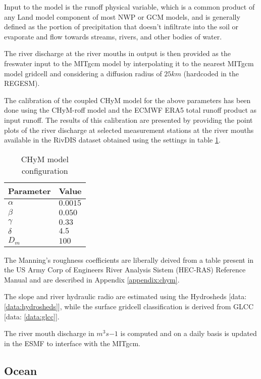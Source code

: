\documentclass[journal abbreviation, manuscript]{copernicus}
\begin{document}
Input to the model is the runoff physical variable, which is a common product
of any Land model component of most NWP or GCM models, and is generally defined
as the portion of precipitation that doesn't infiltrate into the soil or
evaporate and flow towards streams, rivers, and other bodies of water.

The river discharge at the river mouths in output is then provided as the
freswater input to the MITgcm model by interpolating it to the nearest MITgcm
model gridcell and considering a diffusion radius of $25 km$
(hardcoded in the REGESM).

The calibration of the coupled CHyM model for the above parameters has been
done using the CHyM-roff model and the ECMWF ERA5 total runoff product as
input runoff. The results of this calibration are presented by providing the
point plots of the river discharge at selected measurement stations at the
river mouths available in the RivDIS dataset obtained using the
settings in table \ref{table:chym_conf}.

\begin{table}[]
    \begin{tabular}{|l|l|}
        \hline
        Parameter & Value \\
        \hline
        $\alpha$ & $0.0015$ \\
        $\beta$ & $0.050$ \\
        $\gamma$ & $0.33$ \\
        $\delta$ & $4.5$ \\
        $D_m$ & $100$ \\
        \hline
  \end{tabular}
    \caption{CHyM model configuration}
    \label{table:chym_conf}
\end{table}

The Manning's roughness coefficients are liberally deived from a table
present in the US Army Corp of Engineers River Analysis Sistem (HEC-RAS)
Reference Manual \citep{brunner-2020} and are described in Appendix
\ref{appendix:chym}.

The slope and river hydraulic radio are estimated using the Hydrosheds
[data: \ref{data:hydrosheds}], while the surface gridcell classification is
derived from GLCC [data: \ref{data:glcc}].

The river mouth discharge in $m^3s{-1}$ is computed and on a daily basis is
updated in the ESMF to interface with the MITgcm.

\subsection{Ocean}
\end{document}
